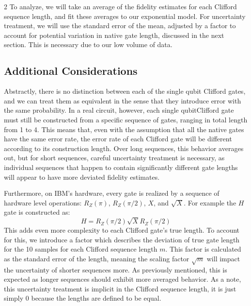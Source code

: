 \documentclass{article}
\begin{document}
\begin{multicols}{2}
To analyze, we will take an average of the fidelity estimates for each Clifford sequence length, and fit these averages to our exponential model. For uncertainty treatment, we will use the standard error of the mean, adjusted by a factor to account for potential variation in native gate length, discussed in the next section. This is necessary due to our low volume of data.   

\subsection{Additional Considerations}
Abstractly, there is no distinction between each of the single qubit Clifford gates, and we can treat them as equivalent in the sense that they introduce error with the same probability. In a real circuit, however, each single qubitClifford gate must still be constructed from a specific sequence of gates, ranging in total length from 1 to 4. This means that, even with the assumption that all the native gates have the same error rate, the error rate of each Clifford gate will be different according to its construction length. Over long sequences, this behavior averages out, but for short sequences, careful uncertainty treatment is necessary, as individual sequences that happen to contain significantly different gate lengths will appear to have more deviated fidelity estimates.

Furthermore, on IBM's hardware, every gate is realized by a sequence of hardware level operations: $R_Z(\pi)$, $R_Z(\pi/2)$, $X$, and $\sqrt{X}$. For example the $H$ gate is constructed as:
\[H = R_Z(\pi/2) \sqrt{X} R_Z(\pi/2)\]
This adds even more complexity to each Clifford gate's true length. To account for this, we introduce a factor which describes the deviation of true gate length for the 10 samples for each Clifford sequence length $m$. This factor is calculated as the standard error of the length, meaning the scaling factor $\sqrt{m}$ will impact the uncertainty of shorter sequences more. As previously mentioned, this is expected as longer sequences should exhibit more averaged behavior. As a note, this uncertainty treatment is implicit in the Clifford sequence length, it is just simply 0 because the lengths are defined to be equal.



\end{multicols}
\end{document}
